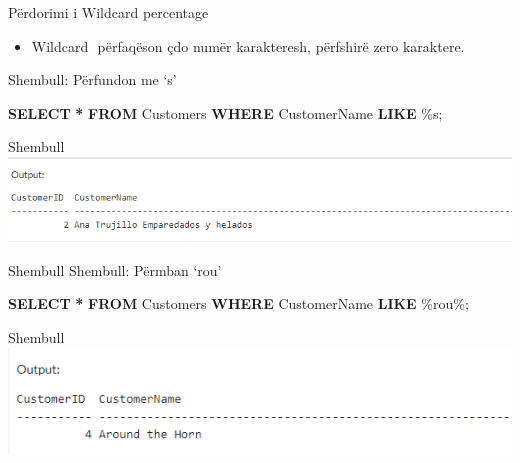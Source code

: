 \documentclass[
  ignorenonframetext,
]{beamer}
\newenvironment{Shaded}{\begin{snugshade}}{\end{snugshade}}
\newcommand{\KeywordTok}[1]{\textcolor[rgb]{0.13,0.29,0.53}{\textbf{#1}}}
\newcommand{\NormalTok}[1]{#1}
\newcommand{\OperatorTok}[1]{\textcolor[rgb]{0.81,0.36,0.00}{\textbf{#1}}}
\newcommand{\StringTok}[1]{\textcolor[rgb]{0.31,0.60,0.02}{#1}}
\providecommand{\tightlist}{%
  \setlength{\itemsep}{0pt}\setlength{\parskip}{0pt}}
\begin{document}
\begin{frame}{Përdorimi i Wildcard percentage}
\label{puxebrdorimi-i-wildcard-percentage}
\begin{itemize}
\tightlist
\item
  Wildcard \(%
  \) përfaqëson çdo numër karakteresh, përfshirë zero karaktere.
\end{itemize}
\end{frame}

\begin{frame}[fragile]{Shembull: Përfundon me `s'}
\label{shembull-puxebrfundon-me-s}
\begin{Shaded}
\begin{Highlighting}[]
\KeywordTok{SELECT} \OperatorTok{*}
\KeywordTok{FROM}\NormalTok{ Customers}
\KeywordTok{WHERE}\NormalTok{ CustomerName }\KeywordTok{LIKE} \StringTok{\textquotesingle{}\%s\textquotesingle{}}\NormalTok{;}
\end{Highlighting}
\end{Shaded}
\end{frame}

\begin{frame}{Shembull}
\label{shembull-11}
\includegraphics{./Figs/query67.png}
\end{frame}

\begin{frame}[fragile]{Shembull}
\label{shembull-12}
Shembull: Përmban `rou'

\begin{Shaded}
\begin{Highlighting}[]
\KeywordTok{SELECT} \OperatorTok{*}
\KeywordTok{FROM}\NormalTok{ Customers}
\KeywordTok{WHERE}\NormalTok{ CustomerName }\KeywordTok{LIKE} \StringTok{\textquotesingle{}\%rou\%\textquotesingle{}}\NormalTok{;}
\end{Highlighting}
\end{Shaded}
\end{frame}

\begin{frame}{Shembull}
\label{shembull-13}
\includegraphics{./Figs/query68.png}
\end{frame}
\end{document}
